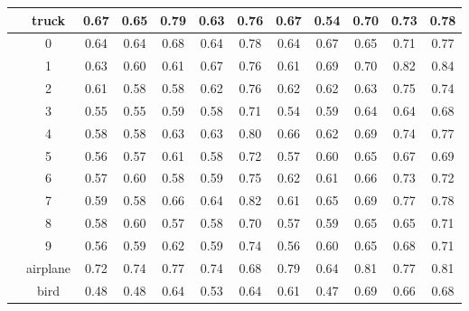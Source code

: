\begin{table}[ht!]
{\begin{tabular}{c c c c c c c c c c c c }
    & truck & 0.67 & 0.65 & \cellcolor{gray!45} 0.79 & 0.63 & \cellcolor{gray!15} 0.76 & 0.67 & 0.54 & 0.70 & 0.73 & \cellcolor{gray!30} 0.78  \\ 
    \midrule
    \parbox[t]{1mm}{} & 0 & 0.64 & 0.64 & 0.68 & 0.64 &  0.78 & 0.64 & 0.67 & 0.65 &  0.71 &  0.77  \\ 
    & 1 & 0.63 & 0.60 & 0.61 & 0.67 &  0.76 & 0.61 & 0.69 & 0.70 &  0.82 &  0.84  \\ 
    & 2 & 0.61 & 0.58 & 0.58 & 0.62 &  0.76 & 0.62 & 0.62 & 0.63 &  0.75 &  0.74  \\ 
    & 3 & 0.55 & 0.55 & 0.59 & 0.58 &  0.71 & 0.54 & 0.59 &  0.64 &  0.64 &  0.68  \\ 
    & 4 & 0.58 & 0.58 & 0.63 & 0.63 &  0.80 & 0.66 & 0.62 & 0.69 &  0.74 &  0.77  \\ 
    & 5 & 0.56 & 0.57 & 0.61 & 0.58 &  0.72 & 0.57 & 0.60 & 0.65 &  0.67 &  0.69  \\ 
    & 6 & 0.57 & 0.60 & 0.58 & 0.59 &  0.75 & 0.62 & 0.61 & 0.66 &  0.73 &  0.72  \\ 
    & 7 & 0.59 & 0.58 & 0.66 & 0.64 &  0.82 & 0.61 & 0.65 & 0.69 &  0.77 &  0.78  \\ 
    & 8 & 0.58 & 0.60 & 0.57 & 0.58 &  0.70 & 0.57 & 0.59 &  0.65 &  0.65 &  0.71  \\ 
    & 9 & 0.56 & 0.59 & 0.62 & 0.59 &  0.74 & 0.56 & 0.60 & 0.65 &  0.68 &  0.71  \\ 
    \midrule
    \parbox[t]{1mm}{} & airplane & 0.72 & 0.74 &  0.77 & 0.74 & 0.68 &  0.79 & 0.64 &  0.81 &  0.77 &  0.81  \\ 
    & bird & 0.48 & 0.48 & 0.64 & 0.53 & 0.64 & 0.61 & 0.47 &  0.69 &  0.66 &  0.68  \\ 

\end{tabular}}
\end{table}
